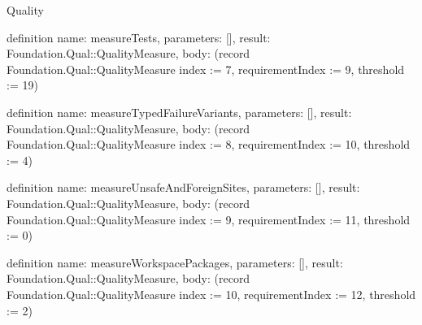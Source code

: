 \begin{lexlean}{Quality}
\begin{semanticmodule}
definition{
  name: measureTests,
  parameters: [],
  result: Foundation.Qual::QualityMeasure,
  body: (record Foundation.Qual::QualityMeasure {index := 7, requirementIndex := 9, threshold := 19})
}

definition{
  name: measureTypedFailureVariants,
  parameters: [],
  result: Foundation.Qual::QualityMeasure,
  body: (record Foundation.Qual::QualityMeasure {index := 8, requirementIndex := 10, threshold := 4})
}

definition{
  name: measureUnsafeAndForeignSites,
  parameters: [],
  result: Foundation.Qual::QualityMeasure,
  body: (record Foundation.Qual::QualityMeasure {index := 9, requirementIndex := 11, threshold := 0})
}

definition{
  name: measureWorkspacePackages,
  parameters: [],
  result: Foundation.Qual::QualityMeasure,
  body: (record Foundation.Qual::QualityMeasure {index := 10, requirementIndex := 12, threshold := 2})
}
\end{semanticmodule}
\end{lexlean}
